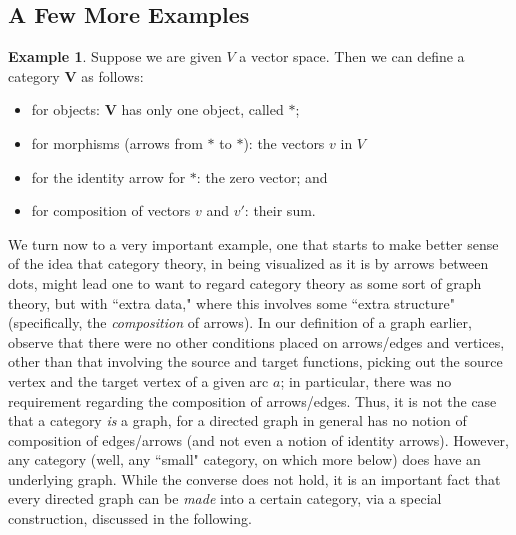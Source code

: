 \documentclass[11pt]{book}
\theoremstyle{definition}
\newtheorem{example}{Example}[section]
\theoremstyle{definition}
\theoremstyle{definition}
\theoremstyle{theorem}
\theoremstyle{definition}
\begin{document}
\subsection{A Few More Examples}
\begin{example}
 	Suppose we are given $V$ a vector space. Then we can define a category $\textbf{V}$ as follows: 
 	\begin{itemize}
 		\item for objects: \textbf{V} has only one object, called $*$; 
 		\item for morphisms (arrows from $*$ to $*$): the vectors $v$ in $V$
 		\item for the identity arrow for $*$: the zero vector; and 
 		\item for composition of vectors $v$ and $v'$: their sum.  
 	\end{itemize} 
\end{example}
We turn now to a very important example, one that starts to make better sense of the idea that category theory, in being visualized as it is by arrows between dots, might lead one to want to regard category theory as some sort of graph theory, but with ``extra data," where this involves some ``extra structure" (specifically, the \textit{composition} of arrows). In our definition of a graph earlier, observe that there were no other conditions placed on arrows/edges and vertices, other than that involving the source and target functions, picking out the source vertex and the target vertex of a given arc $a$; in particular, there was no requirement regarding the composition of arrows/edges. Thus, it is not the case that a category \textit{is} a graph, for a directed graph in general has no notion of composition of edges/arrows (and not even a notion of identity arrows). However, any category (well, any ``small" category, on which more below) does have an underlying graph. While the converse does not hold, it is an important fact that every directed graph can be \textit{made} into a certain category, via a special construction, discussed in the following.     
\end{document}
